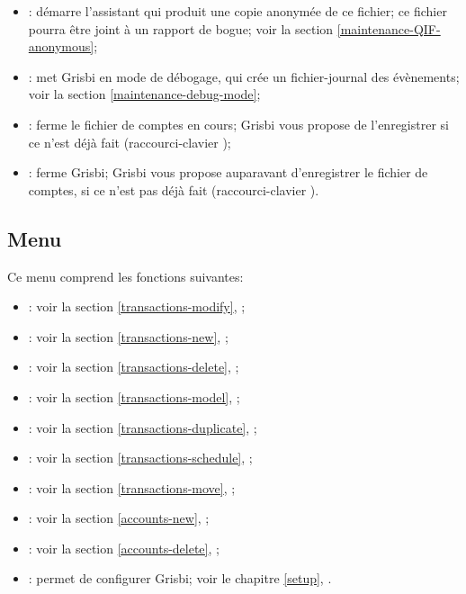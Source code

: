 \begin{itemize}
	\item {}: démarre l'assistant qui produit une copie anonymée de ce fichier; ce fichier pourra être joint à un rapport de bogue; voir la section \vref{maintenance-QIF-anonymous};	
	\item {}: met Grisbi en mode de débogage, qui crée un fichier-journal des évènements; voir la section \vref{maintenance-debug-mode}; 	
	\item {}: ferme le fichier de comptes en cours; Grisbi vous propose de l'enregistrer si ce n'est déjà fait (raccourci-clavier );
	\item {}: ferme Grisbi; Grisbi vous propose auparavant d'enregistrer le fichier de comptes, si ce n'est pas déjà fait (raccourci-clavier ).
\end{itemize}


\subsection{Menu \label{home-menus-edit}}

Ce menu comprend les fonctions suivantes:

\begin{itemize}
	\item {}: voir la section \vref{transactions-modify}, ;
	\item {}: voir la section \vref{transactions-new}, ;
	\item {}: voir la section \vref{transactions-delete}, ;
	\item {}: voir la section \vref{transactions-model}, ;
	\item {}: voir la section \vref{transactions-duplicate}, ;
	\item {}: voir la section \vref{transactions-schedule}, ;
	\item {}: voir la section \vref{transactions-move}, ;
	\item {}: voir la section \vref{accounts-new}, ;
	\item {}: voir la section \vref{accounts-delete}, ;
	\item {}: permet de configurer Grisbi; voir le chapitre \vref{setup}, .
\end{itemize}


